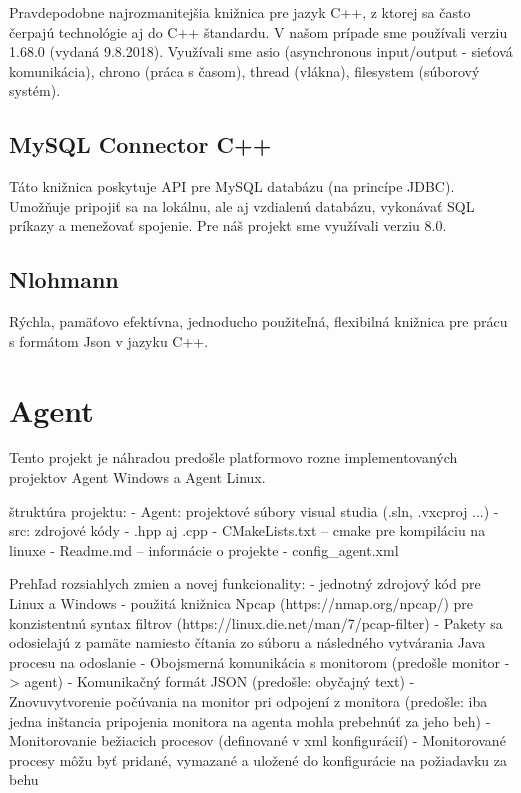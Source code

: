 \documentclass[a4paper,12pt]{article}
\begin{document}
Pravdepodobne najrozmanitejšia knižnica pre jazyk C++, z ktorej sa často čerpajú technológie aj do C++ štandardu. V našom prípade sme používali verziu 1.68.0 (vydaná 9.8.2018). Využívali sme asio (asynchronous input/output - sieťová komunikácia), chrono (práca s časom), thread (vlákna), filesystem (súborový systém).

\subsection{MySQL Connector C++}

Táto knižnica poskytuje API pre MySQL databázu (na princípe JDBC). Umožňuje pripojiť sa na lokálnu, ale aj vzdialenú databázu, vykonávať SQL príkazy a menežovať spojenie. Pre náš projekt sme využívali verziu 8.0.

\subsection{Nlohmann}

Rýchla, pamäťovo efektívna, jednoducho použiteľná, flexibilná knižnica pre prácu s formátom Json v jazyku C++. 

\section{Agent}

Tento projekt je náhradou predošle platformovo rozne implementovaných projektov Agent Windows a Agent Linux. 

štruktúra projektu:
- Agent: projektové súbory visual studia (.sln, .vxcproj ...)
- src: zdrojové kódy - .hpp aj .cpp
- CMakeLists.txt – cmake pre kompiláciu na linuxe
- Readme.md – informácie o projekte
- config\_agent.xml

Prehľad rozsiahlych zmien a novej funkcionality:
- jednotný zdrojový kód pre Linux a Windows
- použitá knižnica Npcap (https://nmap.org/npcap/) pre konzistentnú syntax filtrov (https://linux.die.net/man/7/pcap-filter)
- Pakety sa odosielajú z pamäte namiesto čítania zo súboru a následného vytvárania Java procesu na odoslanie
-  Obojsmerná komunikácia s monitorom (predošle monitor -> agent)
- Komunikačný formát JSON (predošle: obyčajný text)
- Znovuvytvorenie počúvania na monitor pri odpojení z monitora (predošle: iba jedna inštancia pripojenia monitora na agenta mohla prebehnúť za jeho beh)
- Monitorovanie bežiacich procesov (definované v xml konfigurácií)
- Monitorované procesy môžu byť pridané, vymazané a uložené do konfigurácie na požiadavku za behu
\end{document}
